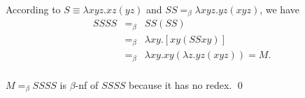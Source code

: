 \begin{pf} \rm According to $S\equiv \lambda xyz.xz(yz)$ and 
$SS =_\beta \lambda xyz. yz(xyz)$, we have
\[
 \begin{array}{rcl}
  SSSS & =_\beta & SS(SS) \\
       & =_\beta & \lambda xy. [ x y ( SSxy) ] \\
       & =_\beta & \lambda xy. xy( \lambda z. yz (xyz) ) = M. \\
 \end{array}
\]

\noindent $M=_\beta SSSS$ is $\beta$-nf of $SSSS$ because it has no redex.
\qed
\end{pf}
